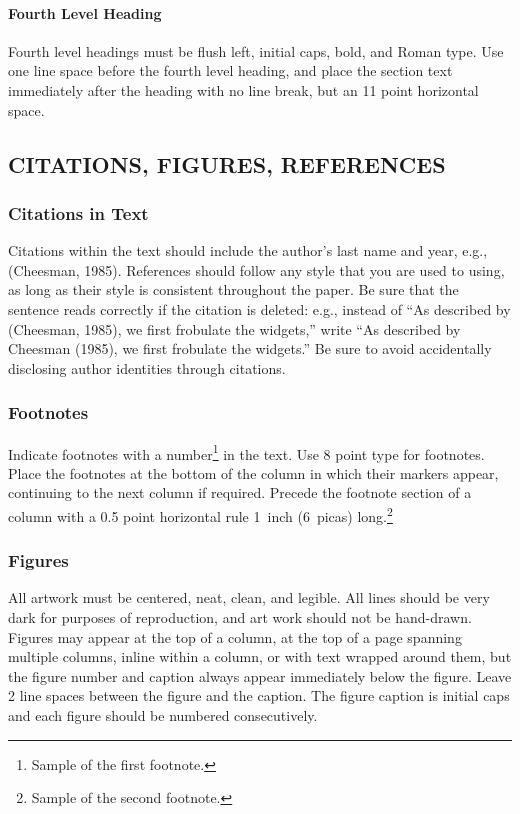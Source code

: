 \documentclass[twoside]{article} \usepackage{aistats2017}
\begin{document}
\paragraph{Fourth Level Heading}

Fourth level headings must be flush left, initial caps, bold, and
Roman type.  Use one line space before the fourth level heading, and
place the section text immediately after the heading with no line
break, but an 11 point horizontal space.

\subsection{CITATIONS, FIGURES, REFERENCES}


\subsubsection{Citations in Text}

Citations within the text should include the author's last name and
year, e.g., (Cheesman, 1985). References should follow any style that
you are used to using, as long as their style is consistent throughout
the paper.  Be sure that the sentence reads correctly if the citation
is deleted: e.g., instead of ``As described by (Cheesman, 1985), we
first frobulate the widgets,'' write ``As described by Cheesman
(1985), we first frobulate the widgets.''  Be sure to avoid
accidentally disclosing author identities through citations.

\subsubsection{Footnotes}

Indicate footnotes with a number\footnote{Sample of the first
  footnote.} in the text. Use 8 point type for footnotes. Place the
footnotes at the bottom of the column in which their markers appear,
continuing to the next column if required. Precede the footnote
section of a column with a 0.5 point horizontal rule 1~inch (6~picas)
long.\footnote{Sample of the second footnote.}

\subsubsection{Figures}

All artwork must be centered, neat, clean, and legible.  All lines
should be very dark for purposes of reproduction, and art work should
not be hand-drawn.  Figures may appear at the top of a column, at the
top of a page spanning multiple columns, inline within a column, or
with text wrapped around them, but the figure number and caption
always appear immediately below the figure.  Leave 2 line spaces
between the figure and the caption. The figure caption is initial caps
and each figure should be numbered consecutively.
\end{document}
